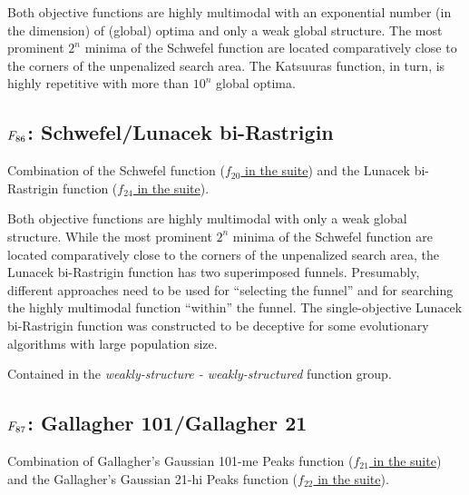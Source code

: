 Both objective functions are highly multimodal with an exponential number
(in the dimension) of (global) optima and only a weak global structure.
The most prominent \(2^n\) minima of the Schwefel function
are located comparatively close to the corners of
the unpenalized search area.
The Katsuuras function, in turn, is highly repetitive with more than \(10^n\)
global optima.



\subsection[\texorpdfstring{\protect\(F_{86}\protect\): Schwefel/Lunacek bi-Rastrigin}{F86: Schwefel/Lunacek bi-Rastrigin}]{\texorpdfstring{\protect\(F_{86}\protect\): Schwefel/Lunacek bi-Rastrigin}{}}
\label{index:f86}\label{index:schwefel-lunacek-bi-rastrigin}
Combination of the Schwefel function (\href{https://coco.gforge.inria.fr/downloads/download16.00/bbobdocfunctions.pdf\#page=100}{\(f_{20}\) in the \bbob suite}) and the
Lunacek bi-Rastrigin function (\href{https://coco.gforge.inria.fr/downloads/download16.00/bbobdocfunctions.pdf\#page=120}{\(f_{24}\) in the \bbob suite}).

Both objective functions are highly multimodal with only a weak global structure.
While the most prominent \(2^n\) minima of the Schwefel function
are located comparatively close to the corners of the unpenalized search area,
the Lunacek bi-Rastrigin function has two superimposed funnels. Presumably,
different approaches need to be used for ``selecting the funnel''
and for searching the highly multimodal function ``within'' the funnel.
The single-objective Lunacek bi-Rastrigin function was constructed
to be deceptive for some evolutionary algorithms with large population size.

Contained in the \emph{weakly-structure - weakly-structured} function group.



\subsection[\texorpdfstring{\protect\(F_{87}\protect\): Gallagher 101/Gallagher 21}{F87: Gallagher 101/Gallagher 21}]{\texorpdfstring{\protect\(F_{87}\protect\): Gallagher 101/Gallagher 21}{}}
\label{index:f87}\label{index:gallagher-101-gallagher-21}
Combination of Gallagher’s Gaussian 101-me Peaks function (\href{https://coco.gforge.inria.fr/downloads/download16.00/bbobdocfunctions.pdf\#page=105}{\(f_{21}\) in the \bbob suite}) and the
Gallagher’s Gaussian 21-hi Peaks function (\href{https://coco.gforge.inria.fr/downloads/download16.00/bbobdocfunctions.pdf\#page=110}{\(f_{22}\) in the \bbob suite}).

